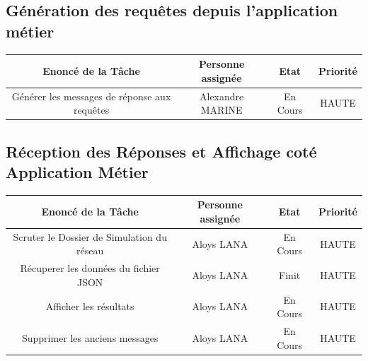 \documentclass[a4paper, 11pt]{article}
\begin{document}
    \subsection{Génération des requêtes depuis l'application métier}
    \begin{center}
    \begin{tabular}{|c|c|c|c|}
        \hline
        Enoncé de la Tâche & Personne assignée & Etat & Priorité\\
        \hline
        \hline
        Générer les messages de réponse aux requêtes  & Alexandre MARINE & En Cours & HAUTE \\
        \hline
    \end{tabular}
    \end{center}

    \subsection{Réception des Réponses et Affichage coté Application Métier}
    \begin{center}
    \begin{tabular}{|c|c|c|c|}
        \hline
        Enoncé de la Tâche & Personne assignée & Etat & Priorité\\
        \hline
        \hline
        Scruter le Dossier de Simulation du réseau  & Aloys LANA & En Cours & HAUTE \\
        \hline
        Récuperer les données du fichier JSON  & Aloys LANA & Finit & HAUTE \\
        \hline
        Afficher les résultats  & Aloys LANA & En Cours & HAUTE \\
        \hline
        Supprimer les anciens messages  & Aloys LANA & En Cours & HAUTE \\
        \hline
    \end{tabular}
    \end{center}
\end{document}
